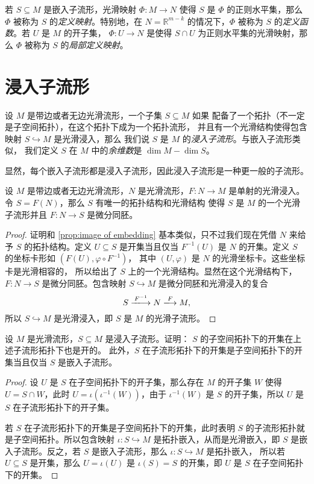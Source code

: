 \documentclass[fontset=none]{Notes}
\begin{document}
若 $S\subseteq M$ 是嵌入子流形，光滑映射 $\varPhi:M\to N$ 使得 $S$ 是 $\varPhi$
的正则水平集，那么 $\varPhi$ 被称为 $S$ 的\emph{定义映射}。特别地，在 $N=\mathbb{R}^{m-k}$
的情况下，$\varPhi$ 被称为 $S$ 的\emph{定义函数}。若 $U$ 是 $M$ 的开子集，
$\varPhi:U\to N$ 是使得 $S\cap U$ 为正则水平集的光滑映射，那么 $\varPhi$
被称为 $S$ 的\emph{局部定义映射}。




\section{浸入子流形}

设 $M$ 是带边或者无边光滑流形，一个子集 $S\subseteq M$ 如果
配备了一个拓扑（不一定是子空间拓扑），在这个拓扑下成为一个拓扑流形，
并且有一个光滑结构使得包含映射 $S\hookrightarrow M$ 是光滑浸入，那么
我们说 $S$ 是 $M$ 的\emph{浸入子流形}。与嵌入子流形类似，
我们定义 $S$ 在 $M$ 中的\emph{余维数}是 $\dim M-\dim S$。

显然，每个嵌入子流形都是浸入子流形，因此浸入子流形是一种更一般的子流形。

\begin{proposition}[浸入的像集作为子流形]\label{prop:image of immersion}
  设 $M$ 是带边或者无边光滑流形，$N$ 是光滑流形，$F:N\to M$
  是单射的光滑浸入。令 $S=F(N)$，那么 $S$ 有唯一的拓扑结构和光滑结构
  使得 $S$ 是 $M$ 的一个光滑子流形并且 $F:N\to S$ 是微分同胚。
\end{proposition}
\begin{proof}
  证明和 \autoref{prop:image of embedding} 基本类似，只不过我们现在凭借
  $N$ 来给予 $S$ 的拓扑结构。定义 $U\subseteq S$ 是开集当且仅当
  $F^{-1}(U)$ 是 $N$ 的开集。定义 $S$ 的坐标卡形如 $\left(F(U),\varphi\circ F^{-1}\right)$，
  其中 $(U,\varphi)$ 是 $N$ 的光滑坐标卡。这些坐标卡是光滑相容的，
  所以给出了 $S$ 上的一个光滑结构。显然在这个光滑结构下，$F:N\to S$
  是微分同胚。包含映射 $S\hookrightarrow M$ 是微分同胚和光滑浸入的复合
  \[
    S\xlongrightarrow{F^{-1}} N\xlongrightarrow{F} M,  
  \]
  所以 $S\hookrightarrow M$ 是光滑浸入，即 $S$ 是 $M$ 的光滑子流形。
\end{proof}

\begin{exercise}{}{}
  设 $M$ 是光滑流形，$S\subseteq M$ 是浸入子流形。证明：
  $S$ 的子空间拓扑下的开集在上述子流形拓扑下也是开的。
  此外，$S$ 在子流形拓扑下的开集是子空间拓扑下的开集当且仅当
  $S$ 是嵌入子流形。
\end{exercise}
\begin{proof}
  设 $U$ 是 $S$ 在子空间拓扑下的开子集，那么存在 $M$ 的开子集 $W$
  使得 $U=S\cap W$，此时 $U=\iota(\iota^{-1}(W))$，由于 $\iota^{-1}(W)$
  是 $S$ 的开子集，所以 $U$ 是 $S$ 在子流形拓扑下的开子集。 

  若 $S$ 在子流形拓扑下的开集是子空间拓扑下的开集，此时表明 $S$
  的子流形拓扑就是子空间拓扑。所以包含映射 $\iota:S\hookrightarrow M$
  是拓扑嵌入，从而是光滑嵌入，即 $S$ 是嵌入子流形。反之，若 $S$
  是嵌入子流形，那么 $\iota:S\hookrightarrow M$ 是拓扑嵌入，
  所以若 $U\subseteq S$ 是开集，那么 $U=\iota(U)$ 是 $\iota(S)=S$
  的开集，即 $U$ 是 $S$ 在子空间拓扑下的开集。
\end{proof}
\end{document}
